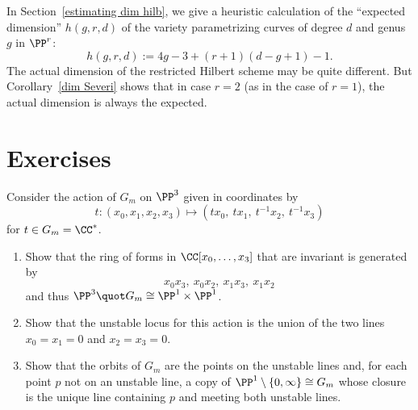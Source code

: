 In Section~\ref{estimating dim hilb}, we give a heuristic calculation of the ``expected dimension'' $h(g,r,d)$ of the variety parametrizing curves of degree $d$ and genus $g$ in $\PP^r$:
$$
h(g,r,d) := 4g-3 + (r+1)(d-g+1) - 1.
$$
The actual dimension of the restricted Hilbert scheme may be quite different. But  Corollary~\ref{dim Severi} shows that in case $r=2$ (as in the case of $r=1$), the actual dimension is always the expected.



\section{Exercises}


\begin{exercise}
Consider the action of $G_m$ on $\PP^3$ given in coordinates by 
$$t: (x_0,x_1,x_2,x_3) \mapsto (tx_0,\ tx_1,\ t^{-1}x_2,\ t^{-1}x_3)
$$
for $t\in G_m = \CC^*$.
\begin{enumerate}
 \item Show that the ring  of forms in $\CC[x_0, \dots, x_3]$ that are invariant is generated by
$$
x_0x_3, \ x_0x_2,\ x_1x_3,\ x_1x_2
$$
and thus $\PP^3\quot G_m\cong \PP^1\times \PP^1$.
\item Show that the unstable locus for this action is the union of the two lines $x_0=x_1=0$ and
$x_2=x_3=0$.
\item Show that the orbits of $G_m$ are the points on the unstable lines and, for each
point $p$ not on an unstable line, a copy of
$\PP^1\setminus \{0,\infty\}\cong G_m$ whose closure is the unique line containing $p$ and
meeting both unstable lines.
\end{enumerate}
\end{exercise}


